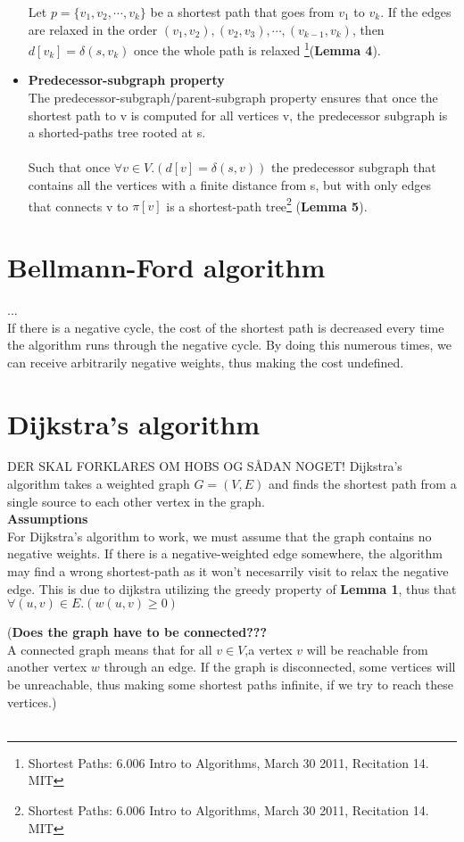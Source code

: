 \documentclass[11pt]{article}
\begin{document}
\begin{itemize}
Let $p = \{v_{1}, v_{2},\cdots ,v_{k}\}$ be a shortest path that goes from $v_{1}$ to $v_{k}$. If the edges are relaxed in the order $(v_{1},v_{2}), (v_{2},v_{3}), \cdots , (v_{k-1}, v_{k})$, then $d[v_{k}] = \delta(s,v_{k})$ once the whole path is relaxed \footnote{Shortest Paths: 6.006 Intro to Algorithms, March 30 2011, Recitation 14. MIT}(\textbf{Lemma 4}).\\
\item \textbf{Predecessor-subgraph property}\\
The predecessor-subgraph/parent-subgraph property ensures that once the shortest path to v is computed for all vertices v, the predecessor subgraph is a shorted-paths tree rooted at s.\\\\
Such that once $\forall v \in V.(d[v] = \delta(s,v))$ the predecessor subgraph that contains all the vertices with a finite distance from s, but with only edges that connects v to $\pi[v]$ is a shortest-path tree\footnote{Shortest Paths: 6.006 Intro to Algorithms, March 30 2011, Recitation 14. MIT} (\textbf{Lemma 5}).
\end{itemize}
\section{Bellmann-Ford algorithm}
...\\
If there is a negative cycle, the cost of the shortest path is decreased every time the algorithm runs through the negative cycle. By doing this numerous times, we can receive arbitrarily negative weights, thus making the cost undefined.
\section{Dijkstra's algorithm}
DER SKAL FORKLARES OM HOBS OG SÅDAN NOGET!
Dijkstra's algorithm takes a weighted graph $G = (V, E)$ and finds the shortest path from a single source to each other vertex in the graph.\\   

\noindent
\textbf{Assumptions}\\
For Dijkstra's algorithm to work, we must assume that the graph contains no negative weights. If there is a negative-weighted edge somewhere, the algorithm may find a wrong shortest-path as it won't necesarrily visit to relax the negative edge. This is due to dijkstra utilizing the greedy property of \textbf{Lemma 1}, thus that $\forall (u,v) \in E.(w(u,v) \geq 0)$


\noindent
(\textbf{Does the graph have to be connected???}\\
A connected graph means that for all $v \in V $,a vertex $v$ will be reachable from another vertex $w$ through an edge. If the graph is disconnected, some vertices will be unreachable, thus making some shortest paths infinite, if we try to reach these vertices.)\\\\
\end{document}
